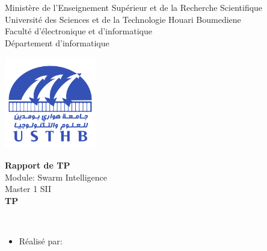 \documentclass[12pt , a4paper]{report}
\begin{document}
\begin{center}
\normalsize{Ministère de l'Enseignement Supérieur et de la Recherche Scientifique}\\
\normalsize{Université des Sciences et de la Technologie Houari Boumediene}\\
\normalsize{Faculté d'électronique et d'informatique}\\
\normalsize{Département d'informatique}\\
\end{center}
\begin{center}
\includegraphics[width=4cm,height=4cm]{usthb.png}
\end{center}

\begin{center}
\Huge{\textbf{Rapport de TP}}\\
\vspace{0.7cm}
\large{Module: Swarm Intelligence}\\
\vspace{0.2cm}
\large{Master 1 SII}\\
\vspace{1.5cm}
\normalsize{\textbf{TP}}
\end{center}
\vspace{3cm}
\\
\begin{itemize}
    \item{Réalisé par:}
\end{itemize}

\vspace{3cm}
\end{document}
